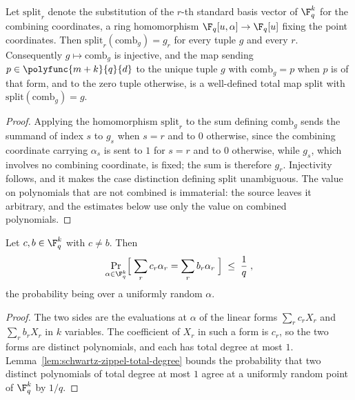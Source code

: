 \begin{lemma}
	\label{lem:ld-combining-split}
	\leanok
	Let $\mathrm{split}_r$ denote the substitution of the $r$-th standard basis
	vector of $\F_q^k$ for the combining coordinates, a ring homomorphism
	$\F_q[u,\alpha] \to \F_q[u]$ fixing the point coordinates.  Then
	$\mathrm{split}_r(\mathrm{comb}_g) = g_r$ for every tuple $g$ and every
	$r$.  Consequently $g \mapsto \mathrm{comb}_g$ is injective, and the map
	sending $p \in \polyfunc{m+k}{q}{d}$ to the unique tuple $g$ with
	$\mathrm{comb}_g = p$ when $p$ is of that form, and to the zero tuple
	otherwise, is a well-defined total map $\mathrm{split}$ with
	$\mathrm{split}(\mathrm{comb}_g) = g$.
\end{lemma}
\begin{proof}
	\leanok
	Applying the homomorphism $\mathrm{split}_r$ to the sum defining
	$\mathrm{comb}_g$ sends the summand of index $s$ to $g_s$ when $s = r$ and to
	$0$ otherwise, since the combining coordinate carrying $\alpha_s$ is sent to
	$1$ for $s = r$ and to $0$ otherwise, while $g_s$, which involves no
	combining coordinate, is fixed; the sum is therefore $g_r$.
	Injectivity follows, and it makes the case distinction defining
	$\mathrm{split}$ unambiguous.  The value on polynomials that are not
	combined is immaterial: the source leaves it arbitrary, and the estimates
	below use only the value on combined polynomials.
\end{proof}

\begin{lemma}
	\label{lem:ld-combining-collision}
	\leanok
	Let $c, b \in \F_q^k$ with $c \neq b$.  Then
	\[
		\Pr_{\alpha \in \F_q^k}\Bigl[\; \sum_{r} c_r \alpha_r
			= \sum_{r} b_r \alpha_r \;\Bigr] \;\le\; \frac1q\;,
	\]
	the probability being over a uniformly random $\alpha$.
\end{lemma}
\begin{proof}
	\leanok
	The two sides are the evaluations at $\alpha$ of the linear forms
	$\sum_r c_r X_r$ and $\sum_r b_r X_r$ in $k$ variables.  The coefficient of
	$X_r$ in such a form is $c_r$, so the two forms are distinct polynomials,
	and each has total degree at most $1$.  Lemma~\ref{lem:schwartz-zippel-total-degree}
	bounds the probability that two distinct polynomials of total degree at most
	$1$ agree at a uniformly random point of $\F_q^k$ by $1/q$.
\end{proof}

